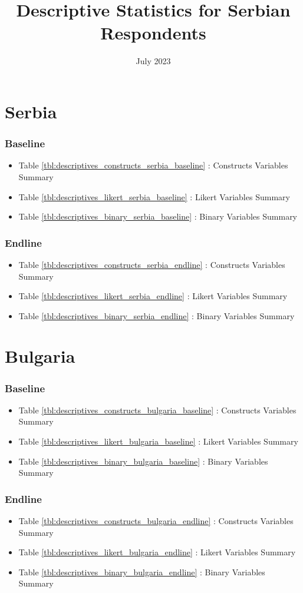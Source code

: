\documentclass{article}
\title{Descriptive Statistics for Serbian Respondents}
\date{July 2023}
\begin{document}
\section*{Serbia}
\subsubsection*{Baseline}
\begin{itemize}
    \item Table \ref{tbl:descriptives_constructs_serbia_baseline} : Constructs Variables Summary
    \item Table \ref{tbl:descriptives_likert_serbia_baseline} : Likert Variables Summary
    \item Table \ref{tbl:descriptives_binary_serbia_baseline} : Binary Variables Summary
\end{itemize}
\subsubsection*{Endline}
\begin{itemize}
    \item Table \ref{tbl:descriptives_constructs_serbia_endline} : Constructs Variables Summary
    \item Table \ref{tbl:descriptives_likert_serbia_endline} : Likert Variables Summary
    \item Table \ref{tbl:descriptives_binary_serbia_endline} : Binary Variables Summary
\end{itemize}


\section*{Bulgaria}
\subsubsection*{Baseline}
\begin{itemize}
    \item Table \ref{tbl:descriptives_constructs_bulgaria_baseline} : Constructs Variables Summary
    \item Table \ref{tbl:descriptives_likert_bulgaria_baseline} : Likert Variables Summary
    \item Table \ref{tbl:descriptives_binary_bulgaria_baseline} : Binary Variables Summary
\end{itemize}

\subsubsection*{Endline}
\begin{itemize}
    \item Table \ref{tbl:descriptives_constructs_bulgaria_endline} : Constructs Variables Summary
    \item Table \ref{tbl:descriptives_likert_bulgaria_endline} : Likert Variables Summary
    \item Table \ref{tbl:descriptives_binary_bulgaria_endline} : Binary Variables Summary
\end{itemize}
\end{document}
